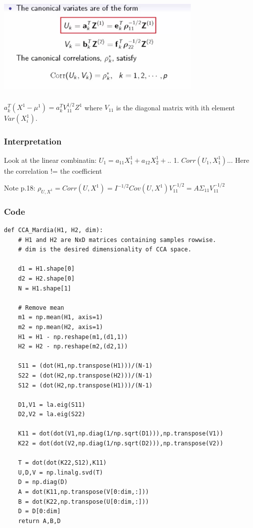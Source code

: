 \documentclass[a4paper]{article}
\begin{document}
\begin{center}
\includegraphics[width=10cm, height=5cm]{z.png}
\end{center}

$a^T_k(X^1-\mu^1) = a_k^T V_{11}^{1/2}Z^1$
where $V_{11}$ is the diagonal matrix with ith element $Var(X_i^1)$.

\subsubsection{Interpretation}

Look at the linear combinatin: $U_1 = a_{11}X_1^1 + a_{12}X_2^1+..$
1. $Corr(U_1, X_1^1)$... Here the correlation != the coefficient

Note p.18:
$\rho_{U,X^1} = Corr(U,X^1) = I^{-1/2}Cov(U,X^1)V_{11}^{-1/2} = A\Sigma_{11}V_{11}^{-1/2}$

\subsubsection{Code}
\begin{verbatim}
def CCA_Mardia(H1, H2, dim):
    # H1 and H2 are NxD matrices containing samples rowwise.
    # dim is the desired dimensionality of CCA space.
    
    d1 = H1.shape[0]
    d2 = H2.shape[0]
    N = H1.shape[1]
    
    # Remove mean
    m1 = np.mean(H1, axis=1)
    m2 = np.mean(H2, axis=1)
    H1 = H1 - np.reshape(m1,(d1,1))
    H2 = H2 - np.reshape(m2,(d2,1))
    
    S11 = (dot(H1,np.transpose(H1)))/(N-1)
    S22 = (dot(H2,np.transpose(H2)))/(N-1)
    S12 = (dot(H2,np.transpose(H1)))/(N-1)

    D1,V1 = la.eig(S11)
    D2,V2 = la.eig(S22)

    K11 = dot(dot(V1,np.diag(1/np.sqrt(D1))),np.transpose(V1))
    K22 = dot(dot(V2,np.diag(1/np.sqrt(D2))),np.transpose(V2))

    T = dot(dot(K22,S12),K11)
    U,D,V = np.linalg.svd(T)
    D = np.diag(D)
    A = dot(K11,np.transpose(V[0:dim,:]))
    B = dot(K22,np.transpose(U[0:dim,:]))
    D = D[0:dim]
    return A,B,D
\end{verbatim}
\end{document}
